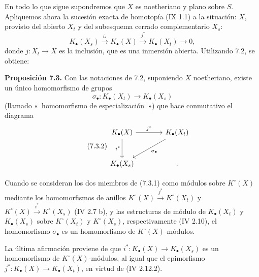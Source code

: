 En todo lo que sigue supondremos que \(X\) es noetheriano y plano sobre \(S\). Apliquemos ahora la sucesión exacta de homotopía (IX 1.1) a la situación: \(X\), provisto del abierto \(X_t\) y del subesquema cerrado complementario \(X_s\):
\[
K_\bullet(X_s)\xrightarrow{i_*}K_\bullet(X)\xrightarrow{j^*}K_\bullet(X_t)\longrightarrow0,
\]
donde \(j:X_t\to X\) es la inclusión, que es una inmersión abierta. Utilizando 7.2, se obtiene:

\textbf{Proposición 7.3.} Con las notaciones de 7.2, suponiendo \(X\) noetheriano, existe un único homomorfismo de grupos
\begin{equation}\tag{7.3.1}
 \sigma_\bullet:K_\bullet(X_t)\longrightarrow K_\bullet(X_s)
\end{equation}
(llamado «~homomorfismo de especialización~») que hace conmutativo el diagrama
\begin{equation}\tag{7.3.2}
\begin{tikzcd}[column sep=large,row sep=large]
K_\bullet(X) \arrow[r,"j^*"] \arrow[d,"i^*"'] & K_\bullet(X_t) \arrow[dl,"\sigma_\bullet"]\\
K_\bullet(X_s) & {.}
\end{tikzcd}
\end{equation}



\providecommand{\Kalg}{K_{\mathrm{alg}}}
\providecommand{\Gralg}{\operatorname{Gr}_{\mathrm{alg}}}
\providecommand{\Grnum}{\operatorname{Gr}_{\mathrm{num}}}
\providecommand{\Knum}{K_{\mathrm{num}}}
\providecommand{\Cl}{\operatorname{Cl}}
\providecommand{\Ch}{\operatorname{Ch}}
\providecommand{\Nm}{\operatorname{N}}
\providecommand{\colim}{\varinjlim}
\providecommand{\Hens}{\operatorname{Hens}}
\providecommand{\Spec}{\operatorname{Spec}}
\providecommand{\coker}{\operatorname{coker}}


Cuando se consideran los dos miembros de (7.3.1) como módulos sobre \(K^\circ(X)\) mediante los homomorfismos de anillos \(K^\circ(X)\xrightarrow{j^*}K^\circ(X_t)\) y \(K^\circ(X)\xrightarrow{i^*}K^\circ(X_s)\) (IV 2.7 b), y las estructuras de módulo de \(K_\bullet(X_t)\) y \(K_\bullet(X_s)\) sobre \(K^\circ(X_t)\) y \(K^\circ(X_s)\), respectivamente (IV 2.10), el homomorfismo \(\sigma_\bullet\) es un homomorfismo de \(K^\circ(X)\)-módulos.

La última afirmación proviene de que \(i^*:K_\bullet(X)\to K_\bullet(X_s)\) es un homomorfismo de \(K^\circ(X)\)-módulos, al igual que el epimorfismo \(j^*:K_\bullet(X)\longrightarrow K_\bullet(X_t)\), en virtud de (IV 2.12.2).

